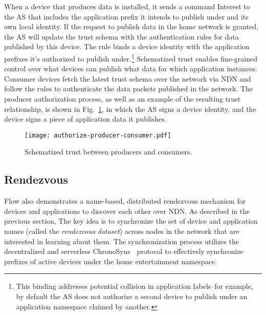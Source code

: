 {%

When a device that produces data is installed, it sends a command Interest to the AS that includes the application prefix it intends to publish under and its own local identity.
If the request to publish data in the home network is granted, the AS will update the trust schema with the authentication rules for data published by this device. The rule binds a device identity with the application prefixes it's authorized to publish under.\footnote{This binding addresses potential collision in application labels--for example, by default the AS does not authorize a second device to publish under an application namespace claimed by another.}
Schematized trust enables fine-grained control over what devices can publish what data for which application instances. Consumer devices fetch the latest trust schema over the network via NDN and follow the rules to authenticate the data packets published in the network.
The producer authorization process, as well as an example of the resulting trust relationship, is shown in Fig.~\ref{fig:flow-app-authorization-trust-relationship}, in which the AS signs a device identity, and the device signs a piece of application data it publishes.

\begin{figure}[!t]
\centering
\texttt{[image: authorize-producer-consumer.pdf]}
\caption{Schematized trust between producers and consumers.}
\label{fig:flow-app-authorization-trust-relationship}
\end{figure}


\subsection{Rendezvous}
\label{sec:rendezvous}

Flow also demonstrates a name-based, distributed rendezvous mechanism for devices and applications to discover each other over NDN.
As described in the previous section, The key idea is to synchronize the set of device and application names (called the \textit{rendezvous dataset}) across nodes in the network that are interested in learning about them.
The synchronization process utilizes the decentralized and serverless ChronoSync~\cite{chronosync} protocol to effectively synchronize prefixes of active devices under the home entertainment  namespace.

}
